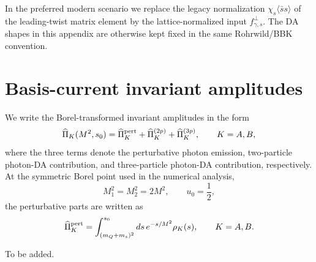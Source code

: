 \documentclass[aps,prd,preprint,nofootinbib,superscriptaddress]{revtex4-2}
\begin{document}
In the preferred modern scenario we replace the legacy normalization
$\chi_s\langle\bar s s\rangle$ of the leading-twist matrix element by the
lattice-normalized input $f_{\gamma,s}^{\perp}$.  The DA shapes in this
appendix are otherwise kept fixed in the same Rohrwild/BBK convention.



\section{Basis-current invariant amplitudes}
\label{app:basis-amplitudes}

We write the Borel-transformed invariant amplitudes in the form
\begin{equation}
  \widehat\Pi_K(M^2,s_0)
  =
  \widehat\Pi_K^{\rm pert}
  +\widehat\Pi_K^{(2p)}
  +\widehat\Pi_K^{(3p)},
  \qquad K=A,B ,
  \label{eq:app-pi-decomp}
\end{equation}
where the three terms denote the perturbative photon emission, two-particle
photon-DA contribution, and three-particle photon-DA contribution,
respectively.  At the symmetric Borel point used in the numerical analysis,
\[
  M_1^2=M_2^2=2M^2,\qquad u_0=\frac12 ,
\]
the perturbative parts are written as
\begin{equation}
  \widehat\Pi_K^{\rm pert}
  =
  \int_{(m_Q+m_s)^2}^{s_0}ds\,e^{-s/M^2}\rho_K(s),
  \qquad K=A,B .
  \label{eq:app-pert}
\end{equation}





\begin{acknowledgments}
To be added.
\end{acknowledgments}



\end{document}
